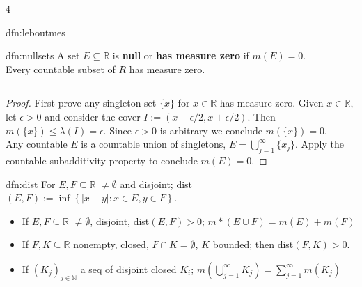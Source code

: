 \documentclass[landscape, 8pt]{extarticle}
\begin{document}
\begin{multicols*}{4}
\begin{dfn}{dfn:leboutmes}{ }
		\end{dfn}
		
		
		\begin{dfn}{dfn:nullsets}{ }
			A set $E \subseteq \mathbb{R}$ is \textbf{null} or \textbf{has measure zero} if $m(E) = 0$.\\
			Every countable subset of $R$ has measure zero.
			\vspace{1pt}
			\hrule	
			\vspace{-6pt}
			\begin{proof}
				First prove any singleton set $\{x\}$ for $x\in \mathbb{R}$ has measure zero. Given $x\in \mathbb{R}$, let $\epsilon > 0$ and consider the cover $I  := \left(x-\epsilon/2, x +\epsilon/2\right)$. Then $m(\{x\}) \le \lambda(I) =\epsilon$. Since $\epsilon > 0$ is arbitrary we conclude $m(\{x\}) = 0$. \\
				Any countable $E$ is a countable union of singletons, $E = \bigcup_{j=1}^\infty \{x_j\}$. Apply the countable subadditivity property to conclude $m(E) = 0$.
			\end{proof}
			
		\end{dfn}
		
		
		\begin{dfn}{dfn:dist}{ }
			For $E, F \subseteq \mathbb{R}$ $\ne \emptyset$ and disjoint; dist$(E, F) := \inf\left\{\left|x-y\right|: x\in E, y\in F\right\}$.
			\begin{itemize}
				\item If $E, F \subseteq \mathbb{R}$ $\ne \emptyset$, disjoint, dist$(E, F) > 0$; $m*(E \cup F) = m(E) + m(F)$
				\item If $F, K \subseteq \mathbb{R}$ nonempty, closed, $F \cap K = \emptyset$, $K$ bounded; then dist$(F, K) > 0$.
				\item If $(K_j)_{j\in \mathbb{N}}$ a seq of disjoint closed $K_i$; $m\left(\bigcup_{j=1}^\infty K_j\right) = \sum_{j=1}^{\infty}m(K_j)$
			\end{itemize}
			
		\end{dfn}
		

\end{multicols*}
\end{document}
